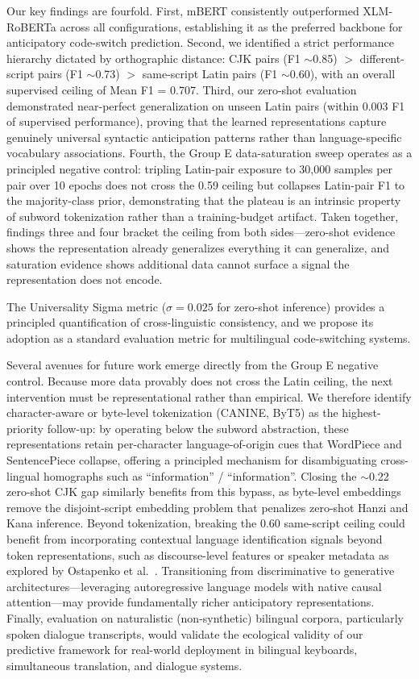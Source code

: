 \documentclass[sigconf,nonacm]{acmart}
\begin{document}
Our key findings are fourfold. First, mBERT consistently outperformed XLM-RoBERTa across all configurations, establishing it as the preferred backbone for anticipatory code-switch prediction. Second, we identified a strict performance hierarchy dictated by orthographic distance: CJK pairs (F1 $\sim$0.85) $>$ different-script pairs (F1 $\sim$0.73) $>$ same-script Latin pairs (F1 $\sim$0.60), with an overall supervised ceiling of Mean F1 = 0.707. Third, our zero-shot evaluation demonstrated near-perfect generalization on unseen Latin pairs (within 0.003 F1 of supervised performance), proving that the learned representations capture genuinely universal syntactic anticipation patterns rather than language-specific vocabulary associations. Fourth, the Group E data-saturation sweep operates as a principled negative control: tripling Latin-pair exposure to 30{,}000 samples per pair over 10 epochs does not cross the 0.59 ceiling but collapses Latin-pair F1 to the majority-class prior, demonstrating that the plateau is an intrinsic property of subword tokenization rather than a training-budget artifact. Taken together, findings three and four bracket the ceiling from both sides---zero-shot evidence shows the representation already generalizes everything it can generalize, and saturation evidence shows additional data cannot surface a signal the representation does not encode.

The Universality Sigma metric ($\sigma = 0.025$ for zero-shot inference) provides a principled quantification of cross-linguistic consistency, and we propose its adoption as a standard evaluation metric for multilingual code-switching systems.

Several avenues for future work emerge directly from the Group E negative control. Because more data provably does not cross the Latin ceiling, the next intervention must be representational rather than empirical. We therefore identify character-aware or byte-level tokenization (CANINE, ByT5) as the highest-priority follow-up: by operating below the subword abstraction, these representations retain per-character language-of-origin cues that WordPiece and SentencePiece collapse, offering a principled mechanism for disambiguating cross-lingual homographs such as ``information'' / ``information''. Closing the $\sim$0.22 zero-shot CJK gap similarly benefits from this bypass, as byte-level embeddings remove the disjoint-script embedding problem that penalizes zero-shot Hanzi and Kana inference. Beyond tokenization, breaking the 0.60 same-script ceiling could benefit from incorporating contextual language identification signals beyond token representations, such as discourse-level features or speaker metadata as explored by Ostapenko et al.~\cite{ostapenko2022speaker}. Transitioning from discriminative to generative architectures---leveraging autoregressive language models with native causal attention---may provide fundamentally richer anticipatory representations. Finally, evaluation on naturalistic (non-synthetic) bilingual corpora, particularly spoken dialogue transcripts, would validate the ecological validity of our predictive framework for real-world deployment in bilingual keyboards, simultaneous translation, and dialogue systems.
\end{document}
